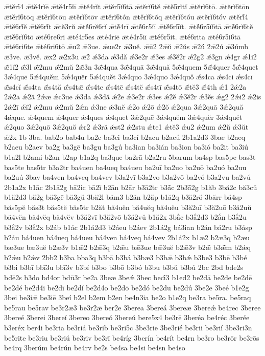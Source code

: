 {ǣtĕrī́4
ǣtĕ4rĭē
ǣtĕ4r5ĭī
ǣtĕ4rĭt
ǣtĕr5ĭ6tā
ǣtĕrĭ6tĕ
ǣtĕ5rĭtĭ
ǣtĕrĭ6tō.
ǣtĕrĭ6tōn
ǣtĕrĭ6tōq
ǣtĕrĭ6tōu
ǣtĕrĭ6tōv
ǣtĕrĭ6tṓn
ǣtĕrĭ6tṓq
ǣtĕrĭ6tṓu
ǣtĕrĭ6tṓv
ǣtĕrĭ́4
ǣtĕ6rĭ́ĕ
ǣtĕ6rĭ́t
ǣtĕ3rŭ
ǣtĕ́6rĕ6rĭ
ǣtĕ́4rī
ǣtĕ́6r5ĭī
ǣtĕ́6r5ĭt.
ǣtĕ́6r5ĭ6tā
ǣtĕ́6rĭ6tĕ
ǣtĕ́6rĭ6tō
ǣté6re6ri
ǣté4r5es
ǣté4riē
ǣté4r5iī
ǣté6r5it.
ǣté6rita
ǣté6r5i6tā
ǣté6ri6te
ǣté6ri6tō
ǣu2
ǣ3ue.
ǣue2r
ǣ3uĕ.
ǣū2
2ǣŭ
ǣ2ŭs
ǣ2ŭ́
2ǣ2ú
ǣ3úmb
ǣ3ve.
ǣ3vĕ.
ǣx2
ǣ2x3u
ǣ2́
ǣ́3da
ǣ́3dă
ǣ́3e2r
ǣ́3es
ǣ́3ĕ2r
ǣ́2g2
ǣ́3gn
ǣ́4gr
ǣ́1i2
ǣ́1ĭ2
ǣ́3l
ǣ́2mu
ǣ́2mŭ
2ǣ́3n
3ǣ́4qua
3ǣ́4quā
3ǣ́4quă
5ǣ́4quem
5ǣ́4quer
5ǣ́4quet
3ǣ́4quē
5ǣ́4quĕm
5ǣ́4quĕr
5ǣ́4quĕt
3ǣ́4quo
3ǣ́4quō
3ǣ́4quŏ
ǣ́s4ca
ǣ́s4ci
ǣ́s4cī
ǣ́s4cĭ
ǣ́s4ta
ǣ́s4tă
ǣ́s4tǣ
ǣ́s4te
ǣ́s4tē
ǣ́s4tĕ
ǣ́s4tī
ǣ́s4tō
ǣ́tĕ3
ǣ́4th
ǽ1
2ǽ2a
2ǽ2ā
ǽ2ă
2ǽæ
ǽc3ue
ǽ3da
ǽ3dă
ǽ2e
ǽ3e2r
ǽ3es
ǽ2ĕ
ǽ3ĕ2r
ǽ3ĕs
ǽg2
2ǽi2
ǽ2is
2ǽ2ī
ǽĭ2
ǽ2mu
ǽ2mŭ
2ǽn
ǽ3ne
ǽ3nĕ
ǽ2o
ǽ2ō
ǽ2ŏ
ǽ2qua
3ǽ2quā
3ǽ2quă
4ǽque.
ǽ4quem
ǽ4quer
ǽ4ques
ǽ4quet
3ǽ2quē
3ǽ4quĕm
3ǽ4quĕr
3ǽ4quĕt
ǽ2quo
3ǽ2quō
3ǽ2quŏ
ǽr2
ǽ3ră
ǽst2
ǽ2stu
ǽte1
ǽtĕ3
ǽu2
ǽ2um
ǽ2ŭ
ǽ3ŭt
ǽ2x
1b
3ba.
bab2o
bab4u
ba2c
ba3ci
ba3cí
b2acu
b2acú
2b1a2d3
3bae
b2aeq
b2aeu
b2aev
ba2g
ba3gē
ba3gu
ba3gú
ba3ian
ba3ián
ba3ion
ba3ió
ba2it
ba3iú
b1a2l
b2ami
b2an
b2ap
b1a2q
ba3que
ba2rā
b2a2ru
5barum
ba4sp
bas5pe
bas3t
bas5te
bas5tr
b3a2tr
ba4uen
ba4ueq
ba4ueu
ba2uī
ba2uo
ba2uō
ba2uó
ba2uu
ba2uú
3bav
ba4ven
ba4veq
ba4vev
b3a2vī
b3a2vo
b3a2vō
ba2vó
b3a2vu
ba2vú
2b1a2x
b1āc
2b1ā2g
bā2ic
bā2ĭ
b2ān
b2ār
b3ā2tr
b3ā́c
2b3ā́2g
b1ăb
3bă2c
bă3cŭ
b1ă2d3
bă2g
bă3gē
bă3gŭ
3bă2l
băm3
b2ăn
b2ăp
b1ă2q
b3ă2rŏ
3bărr
bă4sp
băs5pĕ
băs3t
băs5tĕ
băs5tr
b2ăt
bă4uĕn
bă4uĕq
bă4uĕu
b3ă2uī
b3ă2uō
b3ă2uŭ
bă4vĕn
bă4vĕq
bă4vĕv
b3ă2vī
b3ă2vō
b3ă2vŭ
b1ă2x
3bắc
b3ắ2d3
b2ắn
b3ắ2u
b3ắ2v
b3ắ2x
b2áb
b1ác
2b1á2d3
b2áeu
b2áev
2b1á2g
bá3ian
b2án
bá2ru
b3ásp
b2áu
bá4uen
bá4ueq
bá4ueu
bá4ven
bá4veq
bá4vev
2b1á2x
b1æ2
b2æ3q
b2æu
bæ3ue
bæ3uĕ
b2æ3v
b1ǣ2
b2ǣ3q
b2ǣu
bǣ3ue
bǣ3uĕ
b2ǣ3v
b2ǣ́
b3ǣ́m
b2ǽq
b2ǽu
b2ǽv
2bb2
b3ba
bba3q
b3bā
b3bá
b3bæ3
b3bǣ
b3bǽ
b3be3
b3bē
b3bé
b3bi
b3bī
bbī3u
bbī3v
b3bí
b3bo
b3bō
b3bó
b3bu
b3bŭ
b3bú
2bc
2bd
bde2s
bdē2s
b3do
bd4or
bdū3r
be2a
3beæ
3beǽ
3bec
becī́3
b1ed2
be2dā
be2de
be2dē
be2dé
be2d4i
be2dī
be2dí
be2d4o
be2dō
be2dó
be2du
be2dú
3be2e
3beé
b1e2g
3bei
be3iǣ
be3iē
3beí
b2el
b2em
b2en
be4n3ia
be2o
b1e2q
be3ra
be5ra.
be5raq
be5rau
be5rav
be3r2æ3
be3r2ǣ
ber2e
3berea
3bereá
3bereæ
3bereǽ
be4rec
3beree
3bereé
3berei
3bereí
3bereo
3bereó
3bereú
bere5x4
be3rē
3beréa
be4réc
3berée
b3eréx
ber4i
be3ria
be3riá
be3rib
be3ri5c
3be3rie
3be3rié
be3rii
be3rií
3be3ri3n
be5rite
be3riu
be3riú
be3riv
be3rī
be4ríg
3berín
be4rít
be4rn
be3ro
be3rōr
be3rōs
be4rq
3berúm
be4rún
be4rv
be2s
be4sa
be4si
be4sn
be4so
}
